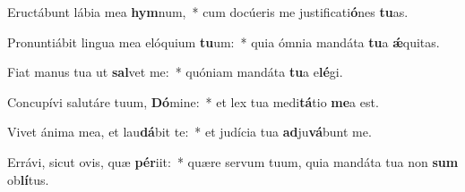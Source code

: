 \item Eructábunt lábia mea \textbf{hym}num,~* cum docúeris me justificati\textbf{ó}nes \textbf{tu}as.
\item Pronuntiábit lingua mea elóquium \textbf{tu}um:~* quia ómnia mandáta \textbf{tu}a \textbf{ǽ}quitas.
\item Fiat manus tua ut \textbf{sal}vet me:~* quóniam mandáta \textbf{tu}a e\textbf{lé}gi.
\item Concupívi salutáre tuum, \textbf{Dó}mine:~* et lex tua medi\textbf{tá}tio \textbf{me}a est.
\item Vivet ánima mea, et lau\textbf{dá}bit te:~* et judícia tua \textbf{ad}ju\textbf{vá}bunt me.
\item Errávi, sicut ovis, quæ \textbf{pér}iit:~* quære servum tuum, quia mandáta tua non \textbf{sum} ob\textbf{lí}tus.
